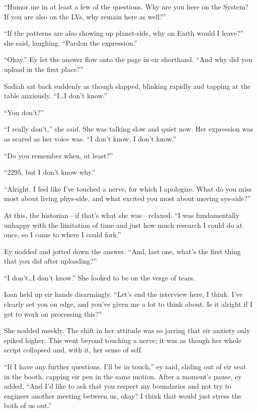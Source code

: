 ``Humor me in at least a few of the questions. Why are you here on the System? If you are also on the LVs, why remain here as well?''

``If the patterns are also showing up planet-side, why on Earth would I leave?'' she said, laughing. ``Pardon the expression.''

``Okay.'' Ey let the answer flow onto the page in eir shorthand. ``And why did you upload in the first place?''

Sadiah sat back suddenly as though slapped, blinking rapidly and tapping at the table anxiously. ``I\ldots I don't know.''

``You don't?''

``I really don't,'' she said. She was talking slow and quiet now. Her expression was as scared as her voice was. ``I don't know, I don't know.''

``Do you remember when, at least?''

``2295, but I don't know why.''

``Alright. I feel like I've touched a nerve, for which I apologize. What do you miss most about living phys-side, and what excited you most about moving sys-side?''

At this, the historian---if that's what she was---relaxed. ``I was fundamentally unhappy with the limitation of time and just how much research I could do at once, so I came to where I could fork.''

Ey nodded and jotted down the answer. ``And, last one, what's the first thing that you did after uploading?''

``I don't\ldots I don't know.'' She looked to be on the verge of tears.

Ioan held up eir hands disarmingly. ``Let's end the interview here, I think. I've clearly set you on edge, and you've given me a lot to think about. Is it alright if I get to work on processing this?''

She nodded meekly. The shift in her attitude was so jarring that eir anxiety only spiked higher. This went beyond touching a nerve; it was as though her whole script collapsed and, with it, her sense of self.

\vspace{1pt}

``If I have any further questions, I'll be in touch,'' ey said, sliding out of eir seat in the booth, capping eir pen in the same motion. After a moment's pause, ey added, ``And I'd like to ask that you respect my boundaries and not try to engineer another meeting between us, okay? I think that would just stress the both of us out.''

